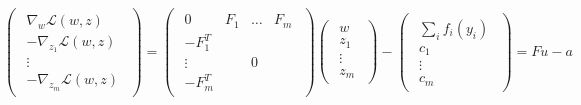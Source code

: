 \documentclass{article}
\begin{document}
\begin{equation}
  \begin{pmatrix}
    \begin{array}{c}
      \nabla_w \mathcal{L}(w,z)\\
      -\nabla_{z_1} \mathcal{L}(w,z)\\
      \vdots\\
      -\nabla_{z_m} \mathcal{L}(w,z)
    \end{array}
  \end{pmatrix} = 
  \begin{pmatrix}
    \begin{array}{cccc}
      0 & F_1 & \dots & F_m\\
      -F_1^T & & &\\
      \vdots & & 0 &\\
      -F_m^T & & &
    \end{array}
  \end{pmatrix}
  \begin{pmatrix}
    \begin{array}{c}
      w\\
      z_1\\
      \vdots\\
      z_m
    \end{array}
  \end{pmatrix} -
  \begin{pmatrix}
    \begin{array}{c}
      \sum_i f_i(y_i)\\
      c_1\\
      \vdots\\
      c_m
    \end{array}
  \end{pmatrix} = F u - a
\end{equation}
\end{document}
